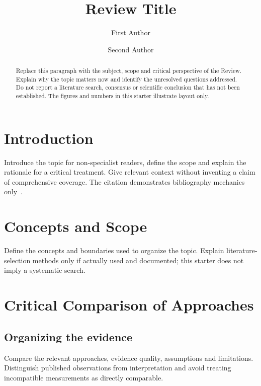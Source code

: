 \documentclass[serif,twocolumn]{prism-wiley-article}
\title{Review Title}
\author[1]{First Author}
\author[1,2]{Second Author}
\affil[1]{Department, First institution, City, Postal code, Country}
\affil[2]{Department, Second institution, City, Postal code, Country}
\begin{document}
\begin{frontmatter}
\maketitle
\begin{abstract}
Replace this paragraph with the subject, scope and critical perspective of
the Review. Explain why the topic matters now and identify the unresolved
questions addressed. Do not report a literature search, consensus or
scientific conclusion that has not been established. The figures and
numbers in this starter illustrate layout only.
\end{abstract}
\end{frontmatter}

\section{Introduction}
Introduce the topic for non-specialist readers, define the scope and explain
the rationale for a critical treatment. Give relevant context without
inventing a claim of comprehensive coverage. The citation demonstrates
bibliography mechanics only~\cite{wilkinson2016fair}.

\section{Concepts and Scope}
Define the concepts and boundaries used to organize the topic. Explain
literature-selection methods only if actually used and documented; this
starter does not imply a systematic search.

\section{Critical Comparison of Approaches}
\subsection{Organizing the evidence}
Compare the relevant approaches, evidence quality, assumptions and
limitations. Distinguish published observations from interpretation and
avoid treating incompatible measurements as directly comparable.
\end{document}
